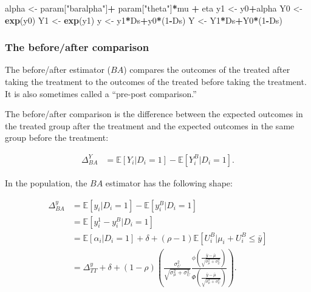\documentclass[]{book}
\newenvironment{Shaded}{\begin{snugshade}}{\end{snugshade}}
\newcommand{\KeywordTok}[1]{\textcolor[rgb]{0.13,0.29,0.53}{\textbf{#1}}}
\newcommand{\DecValTok}[1]{\textcolor[rgb]{0.00,0.00,0.81}{#1}}
\newcommand{\StringTok}[1]{\textcolor[rgb]{0.31,0.60,0.02}{#1}}
\newcommand{\OperatorTok}[1]{\textcolor[rgb]{0.81,0.36,0.00}{\textbf{#1}}}
\newcommand{\NormalTok}[1]{#1}
\newcommand{\esp}[1]{\mathbb{E}[ #1 ]}
\theoremstyle{definition}
\theoremstyle{definition}
\theoremstyle{definition}
\theoremstyle{remark}
\let\BeginKnitrBlock\begin \let\EndKnitrBlock\end
\begin{document}
\begin{Shaded}
\begin{Highlighting}[]
\NormalTok{alpha <-}\StringTok{ }\NormalTok{param[}\StringTok{"baralpha"}\NormalTok{]}\OperatorTok{+}\StringTok{  }\NormalTok{param[}\StringTok{"theta"}\NormalTok{]}\OperatorTok{*}\NormalTok{mu }\OperatorTok{+}\StringTok{ }\NormalTok{eta}
\NormalTok{y1 <-}\StringTok{ }\NormalTok{y0}\OperatorTok{+}\NormalTok{alpha}
\NormalTok{Y0 <-}\StringTok{ }\KeywordTok{exp}\NormalTok{(y0)}
\NormalTok{Y1 <-}\StringTok{ }\KeywordTok{exp}\NormalTok{(y1)}
\NormalTok{y <-}\StringTok{ }\NormalTok{y1}\OperatorTok{*}\NormalTok{Ds}\OperatorTok{+}\NormalTok{y0}\OperatorTok{*}\NormalTok{(}\DecValTok{1}\OperatorTok{-}\NormalTok{Ds)}
\NormalTok{Y <-}\StringTok{ }\NormalTok{Y1}\OperatorTok{*}\NormalTok{Ds}\OperatorTok{+}\NormalTok{Y0}\OperatorTok{*}\NormalTok{(}\DecValTok{1}\OperatorTok{-}\NormalTok{Ds)}
\end{Highlighting}
\end{Shaded}

\subsubsection{The before/after
comparison}\label{the-beforeafter-comparison}

The before/after estimator (\(BA\)) compares the outcomes of the treated
after taking the treatment to the outcomes of the treated before taking
the treatment. It is also sometimes called a ``pre-post comparison.''

\BeginKnitrBlock{definition}[Before/after comparison]
\protect\hypertarget{def:unnamed-chunk-24}{}{\label{def:unnamed-chunk-24}
\iffalse (Before/after comparison) \fi{} }The before/after comparison is
the difference between the expected outcomes in the treated group after
the treatment and the expected outcomes in the same group before the
treatment:

\begin{align*}
\Delta^Y_{BA} & =  \esp{Y_i|D_i=1}-\esp{Y^B_i|D_i=1}.
\end{align*}
\EndKnitrBlock{definition}

\BeginKnitrBlock{example}
\protect\hypertarget{exm:unnamed-chunk-25}{}{\label{exm:unnamed-chunk-25}
}In the population, the \(BA\) estimator has the following shape:

\begin{align*}
  \Delta^y_{BA} & = \esp{y_i|D_i=1}-\esp{y^B_i|D_i=1}\\
                & = \esp{y^1_i-y^B_i|D_i=1}\\
                & = \esp{\alpha_i|D_i=1} + \delta + (\rho-1)\esp{U_i^B|\mu_i+U_i^B\leq\bar{y}}\\
                & = \Delta^y_{TT} + \delta + (1-\rho)\left(\frac{\sigma^2_{U}}{\sqrt{\sigma^2_{\mu}+\sigma^2_{U}}}\frac{\phi\left(\frac{\bar{y}-\bar{\mu}}{\sqrt{\sigma^2_{\mu}+\sigma^2_{U}}}\right)}{\Phi\left(\frac{\bar{y}-\bar{\mu}}{\sqrt{\sigma^2_{\mu}+\sigma^2_{U}}}\right)}\right).
\end{align*}
\EndKnitrBlock{example}
\end{document}
